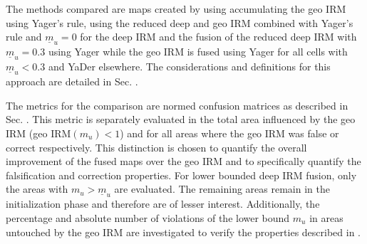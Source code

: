 The methods compared are maps created by using accumulating the geo IRM using Yager's rule, using the reduced deep and geo IRM combined with Yager's rule and $\underline{m}_u = 0$ for the deep IRM and the fusion of the reduced deep IRM with $\underline{m}_u = 0.3$ using Yager while the geo IRM is fused using Yager for all cells with $\underline{m}_u < 0.3$ and YaDer elsewhere. The considerations and definitions for this approach are detailed in Sec. . 

The metrics for the comparison are normed confusion matrices as described in Sec. . This metric is separately evaluated in the total area influenced by the geo IRM (geo IRM$(m_u) < 1$) and for all areas where the geo IRM was false or correct respectively. This distinction is chosen to quantify the overall improvement of the fused maps over the geo IRM and to specifically quantify the falsification and correction properties. For lower bounded deep IRM fusion, only the areas with $m_u > \underline{m}_u$ are evaluated. The remaining areas remain in the initialization phase and therefore are of lesser interest. Additionally, the percentage and absolute number of violations of the lower bound $m_u$ in areas untouched by the geo IRM are investigated to verify the properties described in .
%
